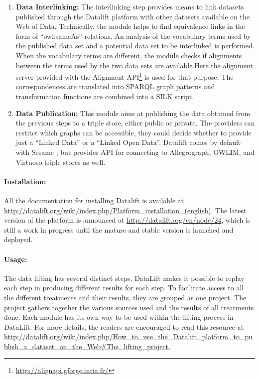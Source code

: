 \begin{itemize}
\begin{enumerate}
\item{\textbf{Data Interlinking:}}
The interlinking step provides means to link datasets published through the Datalift platform with other datasets available on the Web of Data. Technically, the module helps to find equivalence links in the form of ``owl:sameAs'' relations. An analysis of the vocabulary terms used by the published data set and a potential data set to be interlinked is performed. When the vocabulary terms are different, the module checks if alignments between the terms used by the two data sets are available.Here the alignment server provided with the Alignment API\footnote{\url{http://alignapi.gforge.inria.fr/}} is used for that purpose. The correspondences are translated into SPARQL graph patterns and transformation functions are combined into a SILK script.
\item{\textbf{Data Publication:}}
This module aims at publishing the data obtained from the previous steps to a triple store, either public or private. The providers can restrict which graphs can be accessible, they could decide whether to provide just a ``Linked Data'' or a ``Linked Open Data''. Datalift comes by default with Sesame , but provides API for connecting to Allegrograph, OWLIM, and Virtuoso triple stores as well.
\end{enumerate}




\paragraph{Installation:}
All the documentation for installing Datalift is available at \url{http://datalift.org/wiki/index.php/Platform_installation_(english)}. The latest version of the platform is announced at \url{http://datalift.org/en/node/24}, which is still a work in progress until the mature and stable version is launched and deployed.

\paragraph{Usage:}
The data lifting has several distinct steps. DataLift makes it possible to replay each step in producing different results for each step. To facilitate access to all the different treatments and their results, they are grouped as one project. The project gathers together the various sources used and the results of all treatments done.
Each module has its own way to be used within the lifting process in DataLift. For more details, the readers are encouraged to read this resource at \url{http://datalift.org/wiki/index.php/How_to_use_the_Datalift_platform_to_publish_a_dataset_on_the_Web#The_lifting_project. 
}



\end{itemize}
